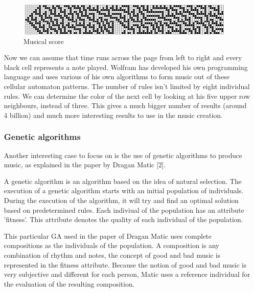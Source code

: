 \documentclass[12pt]{article}
\begin{document}
\begin{figure}[h]
\centering
\includegraphics[]{img/wolframMusic2}
\caption{Musical score}
\end{figure}

Now we can assume that time runs across the page from left to right and every black cell represents a note played. Wolfram has developed his own programming language and uses various of his own algorithms to form music out of these cellular automaton patterns.
\newline
\newline
The number of rules isn't limited by eight individual rules. We can determine the color of the next cell by looking at his five upper row neighbours, instead of three. This gives a much bigger number of results (around 4 billion) and much more interesting results to use in the music creation. 

\subsubsection{Genetic algorithms}

Another interesting case to focus on is the use of genetic algorithms to produce music, as explained in the paper by Dragan Matic [2].
\newline

A genetic algorithm is an algorithm based on the idea of natural selection. The execution of a genetic algorithm starts with an initial population of individuals. During the execution of the algorithm, it will try and find an optimal solution based on predetermined rules. Each indiviual of the population has an attribute 'fitness'. This attribute denotes the quality of each individual of the population.
\newline

This particular GA used in the paper of Dragan Matic uses complete compositions as the individuals of the population. A composition is any combination of rhythm and notes, the concept of good and bad music is represented in the fitness attribute. Because the notion of good and bad music is very subjective and different for each person, Matic uses a reference individual for the evaluation of the resulting composition.
\newline
\end{document}
